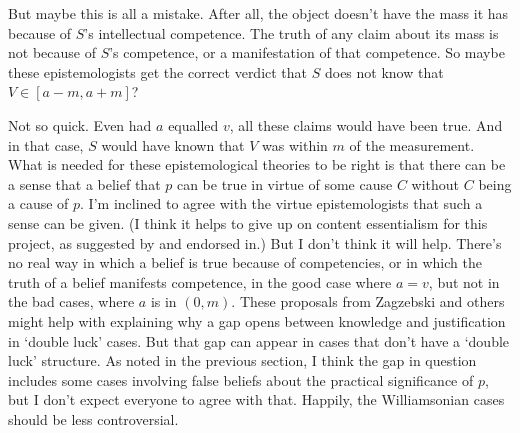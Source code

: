 But maybe this is all a mistake. After all, the object doesn't have the mass it has because of $S$'s intellectual competence. The truth of any claim about its mass is not because of $S$'s competence, or a manifestation of that competence. So maybe these epistemologists get the correct verdict that $S$ does not know that $V \in [a - m, a + m]$?

Not so quick. Even had $a$ equalled $v$, all these claims would have been true. And in that case, $S$ would have known that $V$ was within $m$ of the measurement. What is needed for these epistemological theories to be right is that there can be a sense that a belief that $p$ can be true in virtue of some cause $C$ without $C$ being a cause of $p$. I'm inclined to agree with the virtue epistemologists that such a sense can be given. (I think it helps to give up on content essentialism for this project, as suggested by \cite{David2002} and endorsed in\cite{Weatherson2004-WEALMT}.) But I don't think it will help. There's no real way in which a belief is true because of competencies, or in which the truth of a belief manifests competence, in the good case where $a = v$, but not in the bad cases, where $a$ is in $(0, m)$. These proposals from Zagzebski and others might help with explaining why a gap opens between knowledge and justification in `double luck' cases. But that gap can appear in cases that don't have a `double luck' structure. As noted in the previous section, I think the gap in question includes some cases involving false beliefs about the practical significance of $p$, but I don't expect everyone to agree with that. Happily, the Williamsonian cases should be less controversial.



